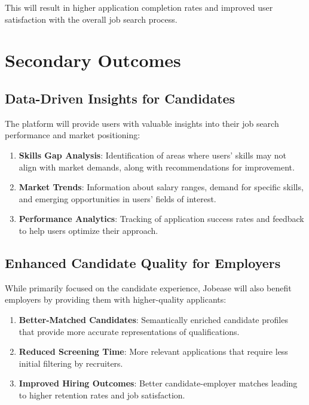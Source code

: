 \documentclass[12pt,a4paper]{report}
\begin{document}
This will result in higher application completion rates and improved user satisfaction with the overall job search process.

\section*{Secondary Outcomes}

\subsection*{Data-Driven Insights for Candidates}

The platform will provide users with valuable insights into their job search performance and market positioning:

\begin{enumerate}
    \item \textbf{Skills Gap Analysis}: Identification of areas where users' skills may not align with market demands, along with recommendations for improvement.
    \item \textbf{Market Trends}: Information about salary ranges, demand for specific skills, and emerging opportunities in users' fields of interest.
    \item \textbf{Performance Analytics}: Tracking of application success rates and feedback to help users optimize their approach.
\end{enumerate}

\subsection*{Enhanced Candidate Quality for Employers}

While primarily focused on the candidate experience, Jobease will also benefit employers by providing them with higher-quality applicants:

\begin{enumerate}
    \item \textbf{Better-Matched Candidates}: Semantically enriched candidate profiles that provide more accurate representations of qualifications.
    \item \textbf{Reduced Screening Time}: More relevant applications that require less initial filtering by recruiters.
    \item \textbf{Improved Hiring Outcomes}: Better candidate-employer matches leading to higher retention rates and job satisfaction.
\end{enumerate}
\end{document}
